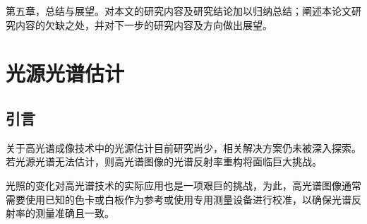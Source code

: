 \documentclass[
    type = master, %
    degree = academic,        %
    decl-page,  %
  ]{njuthesis}
\begin{document}
第五章，总结与展望。对本文的研究内容及研究结论加以归纳总结；阐述本论文研究内容的欠缺之处，并对下一步的研究内容及方向做出展望。 

\chapter{光源光谱估计}

\section{引言}

关于高光谱成像技术中的光源估计目前研究尚少，相关解决方案仍未被深入探索\cite{鲁洋2022基于单幅多光谱图像的照明光谱估计方法}。若光源光谱无法估计，则高光谱图像的光谱反射率重构将面临巨大挑战。

光照的变化对高光谱技术的实际应用也是一项艰巨的挑战\cite{曹汛2020计算光谱成像的前沿进展}，为此，高光谱图像通常需要使用已知的色卡或白板作为参考\cite{li2021multispectral}或使用专用测量设备\cite{alvarez2016practical}进行校准，以确保光谱反射率的测量准确且一致。
\end{document}
